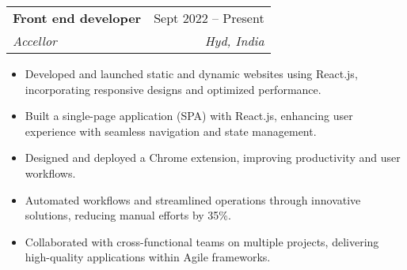 \documentclass[letterpaper,11pt]{article}
\makeatletter
\newcommand{\resumeItem}[1]{
  \item\small{
    {#1 \vspace{-2pt}}
  }
}
\newcommand{\resumeSubheading}[4]{
  \vspace{-2pt}\item
    \begin{tabular*}{0.97\textwidth}[t]{l@{\extracolsep{\fill}}r}
      \textbf{#1} & #2 \\
      \textit{\small#3} & \textit{\small #4} \\
    \end{tabular*}\vspace{-7pt}
}
\newcommand{\resumeSubSubheading}[2]{
    \item
    \begin{tabular*}{0.97\textwidth}{l@{\extracolsep{\fill}}r}
      \textit{\small#1} & \textit{\small #2} \\
    \end{tabular*}\vspace{-7pt}
}
\newcommand{\resumeSubHeadingListEnd}{\end{itemize}}
\newcommand{\resumeItemListStart}{\begin{itemize}}
\newcommand{\resumeItemListEnd}{\end{itemize}\vspace{-5pt}}
\makeatother
\begin{document}
    \resumeSubheading
      {Front end developer}{Sept 2022 -- Present}
      {Accellor}{Hyd, India}
      \resumeItemListStart
        \resumeItem{Developed and launched static and dynamic websites using React.js, incorporating responsive designs and optimized performance.}
        \resumeItem{Built a single-page application (SPA) with React.js, enhancing user experience with seamless navigation and state management.}
        \resumeItem{Designed and deployed a Chrome extension, improving productivity and user workflows.}
        \resumeItem{Automated workflows and streamlined operations through innovative solutions, reducing manual efforts by 35\%.}
        \resumeItem{Collaborated with cross-functional teams on multiple projects, delivering high-quality applications within Agile frameworks.}
      \resumeItemListEnd


\end{document}
